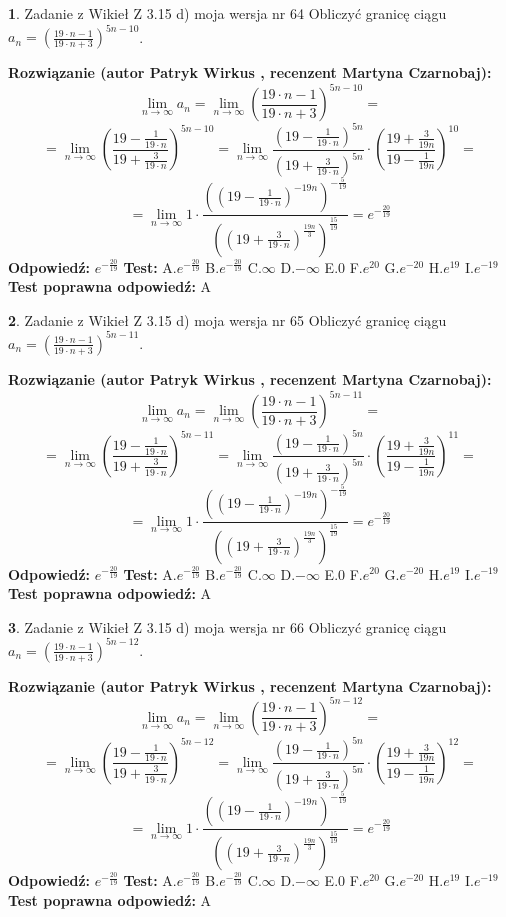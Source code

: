 \documentclass[12pt, a4paper]{article}
\theoremstyle{definition} %
\newtheorem{zad}{}
\newcommand{\zadStart}[1]{\begin{zad}#1\newline}
\newcommand{\zadStop}{\end{zad}}
\newcommand{\rozwStart}[2]{\noindent \textbf{Rozwiązanie (autor #1 , recenzent #2): }\newline}
\newcommand{\rozwStop}{\newline}
\newcommand{\odpStart}{\noindent \textbf{Odpowiedź:}\newline}
\newcommand{\odpStop}{\newline}
\newcommand{\testStart}{\noindent \textbf{Test:}\newline}
\newcommand{\testStop}{\newline}
\newcommand{\kluczStart}{\noindent \textbf{Test poprawna odpowiedź:}\newline}
\newcommand{\kluczStop}{\newline}
\begin{document}
\zadStart{Zadanie z Wikieł Z 3.15 d) moja wersja nr 64}
Obliczyć granicę ciągu $a_{n}=(\frac{19\cdot n - 1}{19 \cdot n + 3})^{5n-10}$.
\zadStop
\rozwStart{Patryk Wirkus}{Martyna Czarnobaj}
$$\lim\limits_{n\to\infty} a_{n} = \lim\limits_{n\to\infty}(\frac{19\cdot n - 1}{19 \cdot n + 3})^{5n-10}=$$
$$=\lim\limits_{n\to\infty}(\frac{19 - \frac{1}{19\cdot n}}{19 + \frac{3}{19 \cdot n}})^{5n-10}=\lim\limits_{n\to\infty}\frac{(19 - \frac{1}{19\cdot n})^{5n}}{(19 + \frac{3}{19\cdot n})^{5n}} \cdot (\frac{19+\frac{3}{19n}}{19-\frac{1}{19n}})^{10}=$$
$$=\lim\limits_{n\to\infty} 1 \cdot \frac{((19-\frac{1}{19 \cdot n})^{-19n})^{-\frac{5}{19}}}{((19+\frac{3}{19 \cdot n})^{\frac{19n}{3}})^{\frac{15}{19}}} =e^{-\frac{20}{19}}$$
\rozwStop
\odpStart
$e^{-\frac{20}{19}}$
\odpStop
\testStart
A.$ e^{-\frac{20}{19}}$
B.$ e^{-\frac{20}{19}}$
C.$\infty$
D.$-\infty$
E.$0$
F.$e^{20}$
G.$e^{-20}$
H.$e^{19}$
I.$e^{-19}$
\testStop
\kluczStart
A
\kluczStop



\zadStart{Zadanie z Wikieł Z 3.15 d) moja wersja nr 65}
Obliczyć granicę ciągu $a_{n}=(\frac{19\cdot n - 1}{19 \cdot n + 3})^{5n-11}$.
\zadStop
\rozwStart{Patryk Wirkus}{Martyna Czarnobaj}
$$\lim\limits_{n\to\infty} a_{n} = \lim\limits_{n\to\infty}(\frac{19\cdot n - 1}{19 \cdot n + 3})^{5n-11}=$$
$$=\lim\limits_{n\to\infty}(\frac{19 - \frac{1}{19\cdot n}}{19 + \frac{3}{19 \cdot n}})^{5n-11}=\lim\limits_{n\to\infty}\frac{(19 - \frac{1}{19\cdot n})^{5n}}{(19 + \frac{3}{19\cdot n})^{5n}} \cdot (\frac{19+\frac{3}{19n}}{19-\frac{1}{19n}})^{11}=$$
$$=\lim\limits_{n\to\infty} 1 \cdot \frac{((19-\frac{1}{19 \cdot n})^{-19n})^{-\frac{5}{19}}}{((19+\frac{3}{19 \cdot n})^{\frac{19n}{3}})^{\frac{15}{19}}} =e^{-\frac{20}{19}}$$
\rozwStop
\odpStart
$e^{-\frac{20}{19}}$
\odpStop
\testStart
A.$ e^{-\frac{20}{19}}$
B.$ e^{-\frac{20}{19}}$
C.$\infty$
D.$-\infty$
E.$0$
F.$e^{20}$
G.$e^{-20}$
H.$e^{19}$
I.$e^{-19}$
\testStop
\kluczStart
A
\kluczStop



\zadStart{Zadanie z Wikieł Z 3.15 d) moja wersja nr 66}
Obliczyć granicę ciągu $a_{n}=(\frac{19\cdot n - 1}{19 \cdot n + 3})^{5n-12}$.
\zadStop
\rozwStart{Patryk Wirkus}{Martyna Czarnobaj}
$$\lim\limits_{n\to\infty} a_{n} = \lim\limits_{n\to\infty}(\frac{19\cdot n - 1}{19 \cdot n + 3})^{5n-12}=$$
$$=\lim\limits_{n\to\infty}(\frac{19 - \frac{1}{19\cdot n}}{19 + \frac{3}{19 \cdot n}})^{5n-12}=\lim\limits_{n\to\infty}\frac{(19 - \frac{1}{19\cdot n})^{5n}}{(19 + \frac{3}{19\cdot n})^{5n}} \cdot (\frac{19+\frac{3}{19n}}{19-\frac{1}{19n}})^{12}=$$
$$=\lim\limits_{n\to\infty} 1 \cdot \frac{((19-\frac{1}{19 \cdot n})^{-19n})^{-\frac{5}{19}}}{((19+\frac{3}{19 \cdot n})^{\frac{19n}{3}})^{\frac{15}{19}}} =e^{-\frac{20}{19}}$$
\rozwStop
\odpStart
$e^{-\frac{20}{19}}$
\odpStop
\testStart
A.$ e^{-\frac{20}{19}}$
B.$ e^{-\frac{20}{19}}$
C.$\infty$
D.$-\infty$
E.$0$
F.$e^{20}$
G.$e^{-20}$
H.$e^{19}$
I.$e^{-19}$
\testStop
\kluczStart
A
\kluczStop
\end{document}
